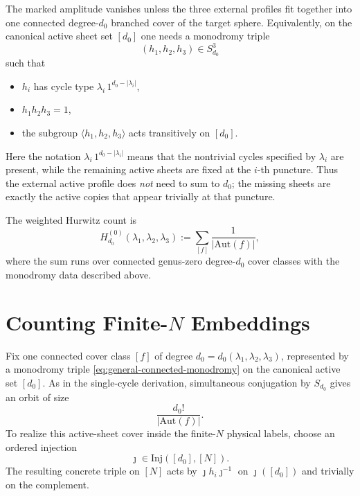 \documentclass[11pt]{article}
\newcommand{\Aut}{\mathrm{Aut}}
\newcommand{\Inj}{\mathrm{Inj}}
\begin{document}
The marked amplitude vanishes unless the three external profiles fit together into one connected degree-$d_0$ branched cover of the target sphere. Equivalently, on the canonical active sheet set $[d_0]$ one needs a monodromy triple
\begin{equation}\label{eq:general-connected-monodromy}
(h_1,h_2,h_3)\in S_{d_0}^3
\end{equation}
such that
\begin{itemize}
\item $h_i$ has cycle type $\lambda_i\,1^{d_0-|\lambda_i|}$,
\item $h_1h_2h_3=1$,
\item the subgroup $\langle h_1,h_2,h_3\rangle$ acts transitively on $[d_0]$.
\end{itemize}
Here the notation $\lambda_i\,1^{d_0-|\lambda_i|}$ means that the nontrivial cycles specified by $\lambda_i$ are present, while the remaining active sheets are fixed at the $i$-th puncture. Thus the external active profile does \emph{not} need to sum to $d_0$; the missing sheets are exactly the active copies that appear trivially at that puncture.

The weighted Hurwitz count is
\begin{equation}\label{eq:general-hurwitz-weighted}
H_{d_0}^{(0)}(\lambda_1,\lambda_2,\lambda_3)
:=
\sum_{[f]}
\frac{1}{|\Aut(f)|},
\end{equation}
where the sum runs over connected genus-zero degree-$d_0$ cover classes with the monodromy data described above.

\section{Counting Finite-\texorpdfstring{$N$}{N} Embeddings}
Fix one connected cover class $[f]$ of degree $d_0=d_0(\lambda_1,\lambda_2,\lambda_3)$, represented by a monodromy triple \eqref{eq:general-connected-monodromy} on the canonical active set $[d_0]$. As in the single-cycle derivation, simultaneous conjugation by $S_{d_0}$ gives an orbit of size
\begin{equation}\label{eq:general-orbit-size}
\frac{d_0!}{|\Aut(f)|}.
\end{equation}
To realize this active-sheet cover inside the finite-$N$ physical labels, choose an ordered injection
\begin{equation}\label{eq:general-cover-injection}
\jmath\in \Inj([d_0],[N]).
\end{equation}
The resulting concrete triple on $[N]$ acts by $\jmath h_i\jmath^{-1}$ on $\jmath([d_0])$ and trivially on the complement.
\end{document}
